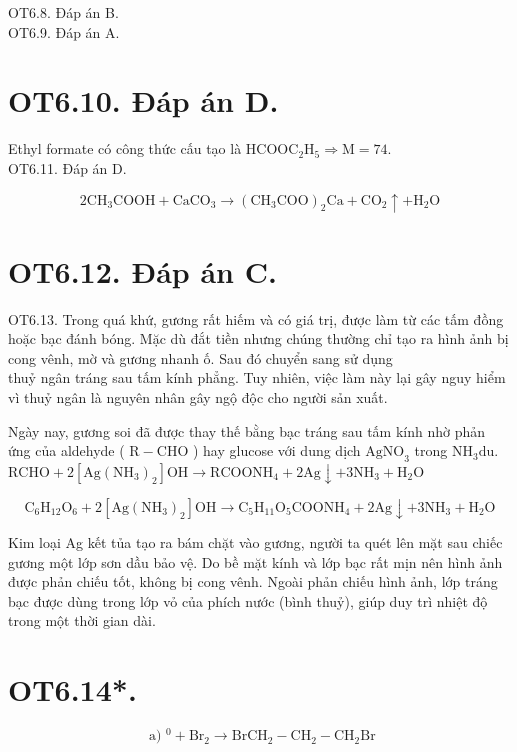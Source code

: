 \documentclass[10pt]{article}
\begin{document}
OT6.8. Đáp án B.\\
OT6.9. Đáp án A.

\section*{OT6.10. Đáp án D.}
Ethyl formate có công thức cấu tạo là $\mathrm{HCOOC}_{2} \mathrm{H}_{5} \Rightarrow \mathrm{M}=74$.\\
OT6.11. Đáp án D.

$$
2 \mathrm{CH}_{3} \mathrm{COOH}+\mathrm{CaCO}_{3} \rightarrow\left(\mathrm{CH}_{3} \mathrm{COO}\right)_{2} \mathrm{Ca}+\mathrm{CO}_{2} \uparrow+\mathrm{H}_{2} \mathrm{O}
$$

\section*{OT6.12. Đáp án C.}
OT6.13. Trong quá khứ, gương rất hiếm và có giá trị, được làm từ các tấm đồng hoặc bạc đánh bóng. Mặc dù đắt tiền nhưng chúng thường chỉ tạo ra hình ảnh bị cong vênh, mờ và gương nhanh ố. Sau đó chuyển sang sử dụng\\
thuỷ ngân tráng sau tấm kính phẳng. Tuy nhiên, việc làm này lại gây nguy hiểm vì thuỷ ngân là nguyên nhân gây ngộ độc cho người sản xuất.

Ngày nay, gương soi đã được thay thế bằng bạc tráng sau tấm kính nhờ phản ứng của aldehyde ( $\mathrm{R}-\mathrm{CHO}$ ) hay glucose với dung dịch $\mathrm{AgNO}_{3}$ trong $\mathrm{NH}_{3} \mathrm{du}$.\\
$\mathrm{RCHO}+2\left[\mathrm{Ag}\left(\mathrm{NH}_{3}\right)_{2}\right] \mathrm{OH} \rightarrow \mathrm{RCOONH}_{4}+2 \mathrm{Ag} \downarrow+3 \mathrm{NH}_{3}+\mathrm{H}_{2} \mathrm{O}$

$$
\mathrm{C}_{6} \mathrm{H}_{12} \mathrm{O}_{6}+2\left[\mathrm{Ag}\left(\mathrm{NH}_{3}\right)_{2}\right] \mathrm{OH} \rightarrow \mathrm{C}_{5} \mathrm{H}_{11} \mathrm{O}_{5} \mathrm{COONH}_{4}+2 \mathrm{Ag} \downarrow+3 \mathrm{NH}_{3}+\mathrm{H}_{2} \mathrm{O}
$$

Kim loại Ag kết tủa tạo ra bám chặt vào gương, người ta quét lên mặt sau chiếc gương một lớp sơn dầu bảo vệ. Do bề mặt kính và lớp bạc rất mịn nên hình ảnh được phản chiếu tốt, không bị cong vênh. Ngoài phản chiếu hình ảnh, lớp tráng bạc được dùng trong lớp vỏ của phích nước (bình thuỷ), giúp duy trì nhiệt độ trong một thời gian dài.

\section*{OT6.14*.}
$$
\text { a) }{ }^{0}+\mathrm{Br}_{2} \rightarrow \mathrm{BrCH}_{2}-\mathrm{CH}_{2}-\mathrm{CH}_{2} \mathrm{Br}
$$
\end{document}
